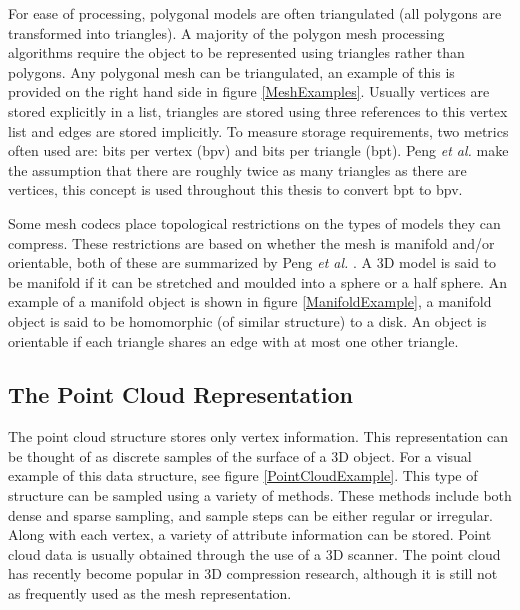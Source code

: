 For ease of processing, polygonal models are often triangulated (all polygons are transformed into triangles). A majority of the polygon mesh processing algorithms require the object to be represented using triangles rather than polygons. Any polygonal mesh can be triangulated, an example of this is provided on the right hand side in figure \ref{MeshExamples}. Usually vertices are stored explicitly in a list, triangles are stored using three references to this vertex list and edges are stored implicitly. To measure storage requirements, two metrics often used are: bits per vertex (bpv) and bits per triangle (bpt). Peng \textit{et al.} \cite{Peng05Technologies} make the assumption that there are roughly twice as many triangles as there are vertices, this concept is used throughout this thesis to convert bpt to bpv.


Some mesh codecs place topological restrictions on the types of models they can compress. These restrictions are based on whether the mesh is manifold and/or orientable, both of these are summarized by Peng \textit{et al.} \cite{Peng05Technologies}. A 3D model is said to be manifold if it can be stretched and moulded into a sphere or a half sphere. An example of a manifold object is shown in figure \ref{ManifoldExample}, a manifold object is said to be homomorphic (of similar structure) to a disk. An object is orientable if each triangle shares an edge with at most one other triangle. 




\subsection{The Point Cloud Representation}

The point cloud structure stores only vertex information. This representation can be thought of as discrete samples of the surface of a 3D object. For a visual example of this data structure, see figure \ref{PointCloudExample}. This type of structure can be sampled using a variety of methods. These methods include both dense and sparse sampling, and sample steps can be either regular or irregular. Along with each vertex, a variety of attribute information can be stored. Point cloud data is usually obtained through the use of a 3D scanner. The point cloud has recently become popular in 3D compression research, although it is still not as frequently used as the mesh representation.

